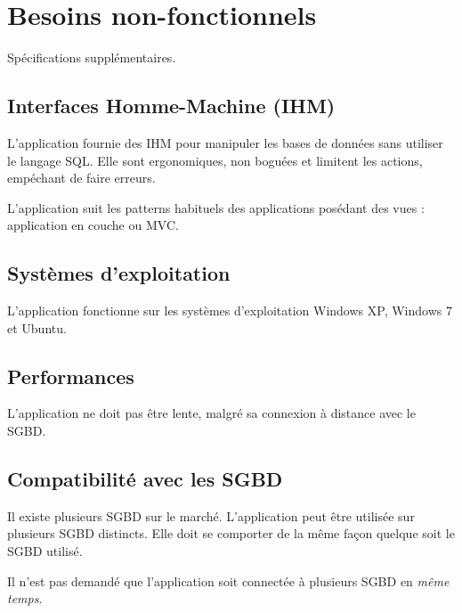 \section{Besoins non-fonctionnels}
Spécifications supplémentaires.
\subsection{Interfaces Homme-Machine (IHM)}
L'application fournie des IHM pour manipuler les bases de données sans utiliser le langage SQL.
Elle sont ergonomiques, non boguées et limitent les actions, empéchant de faire  erreurs.

L'application suit les patterns habituels des applications posédant des vues :
application en couche ou MVC.

\subsection{Systèmes d'exploitation}
L'application fonctionne sur les systèmes d'exploitation Windows XP, Windows 7 et Ubuntu.

\subsection{Performances}
L'application ne doit pas être lente, malgré sa connexion à distance avec le SGBD.

\subsection{Compatibilité avec les SGBD}
Il existe plusieurs SGBD sur le marché.
L'application peut être utilisée sur plusieurs SGBD distincts.
Elle doit se comporter de la même façon quelque soit le SGBD utilisé.

Il n'est pas demandé que l'application soit connectée à plusieurs SGBD en \textit{même temps}.
